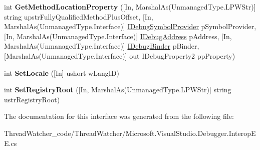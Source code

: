 \begin{DoxyCompactItemize}
\item 
\hypertarget{interface_microsoft_1_1_visual_studio_1_1_debugger_1_1_interop_e_e_1_1_i_debug_expression_evaluator_a9d5156f082e763b2aaf5bdb835ab5fcc}{int {\bfseries Get\+Method\+Location\+Property} (\mbox{[}In, Marshal\+As(Unmanaged\+Type.\+L\+P\+W\+Str)\mbox{]} string upstr\+Fully\+Qualified\+Method\+Plus\+Offset, \mbox{[}In, Marshal\+As(Unmanaged\+Type.\+Interface)\mbox{]} \hyperlink{interface_microsoft_1_1_visual_studio_1_1_debugger_1_1_interop_e_e_1_1_i_debug_symbol_provider}{I\+Debug\+Symbol\+Provider} p\+Symbol\+Provider, \mbox{[}In, Marshal\+As(Unmanaged\+Type.\+Interface)\mbox{]} \hyperlink{interface_microsoft_1_1_visual_studio_1_1_debugger_1_1_interop_e_e_1_1_i_debug_address}{I\+Debug\+Address} p\+Address, \mbox{[}In, Marshal\+As(Unmanaged\+Type.\+Interface)\mbox{]} \hyperlink{interface_microsoft_1_1_visual_studio_1_1_debugger_1_1_interop_e_e_1_1_i_debug_binder}{I\+Debug\+Binder} p\+Binder, \mbox{[}Marshal\+As(Unmanaged\+Type.\+Interface)\mbox{]} out I\+Debug\+Property2 pp\+Property)}\label{interface_microsoft_1_1_visual_studio_1_1_debugger_1_1_interop_e_e_1_1_i_debug_expression_evaluator_a9d5156f082e763b2aaf5bdb835ab5fcc}

\item 
\hypertarget{interface_microsoft_1_1_visual_studio_1_1_debugger_1_1_interop_e_e_1_1_i_debug_expression_evaluator_acfb4e3c7694a917900707322af4a3742}{int {\bfseries Set\+Locale} (\mbox{[}In\mbox{]} ushort w\+Lang\+I\+D)}\label{interface_microsoft_1_1_visual_studio_1_1_debugger_1_1_interop_e_e_1_1_i_debug_expression_evaluator_acfb4e3c7694a917900707322af4a3742}

\item 
\hypertarget{interface_microsoft_1_1_visual_studio_1_1_debugger_1_1_interop_e_e_1_1_i_debug_expression_evaluator_a83b580b7900fbbb80057f4ad707f9c39}{int {\bfseries Set\+Registry\+Root} (\mbox{[}In, Marshal\+As(Unmanaged\+Type.\+L\+P\+W\+Str)\mbox{]} string ustr\+Registry\+Root)}\label{interface_microsoft_1_1_visual_studio_1_1_debugger_1_1_interop_e_e_1_1_i_debug_expression_evaluator_a83b580b7900fbbb80057f4ad707f9c39}

\end{DoxyCompactItemize}


The documentation for this interface was generated from the following file\+:\begin{DoxyCompactItemize}
\item 
Thread\+Watcher\+\_\+code/\+Thread\+Watcher/Microsoft.\+Visual\+Studio.\+Debugger.\+Interop\+E\+E.\+cs\end{DoxyCompactItemize}

